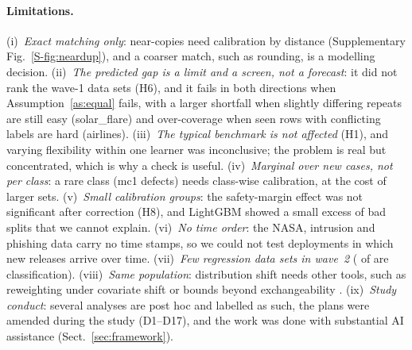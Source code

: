 \paragraph{Limitations.} (i)~\emph{Exact matching only}: near-copies need calibration by distance (Supplementary Fig.~\ref{S-fig:neardup}), and a coarser match, such as rounding, is a modelling decision. (ii)~\emph{The predicted gap is a limit and a screen, not a forecast}: it did not rank the wave-1 data sets (H6), and it fails in both directions when Assumption~\ref{as:equal} fails, with a larger shortfall when slightly differing repeats are still easy (solar\_flare) and over-coverage when seen rows with conflicting labels are hard (airlines). (iii)~\emph{The typical benchmark is not affected} (H1), and varying flexibility within one learner was inconclusive; the problem is real but concentrated, which is why a check is useful. (iv)~\emph{Marginal over new cases, not per class}: a rare class (mc1 defects) needs class-wise calibration, at the cost of larger sets. (v)~\emph{Small calibration groups}: the safety-margin effect was not significant after correction (H8), and LightGBM showed a small excess of bad splits that we cannot explain. (vi)~\emph{No time order}: the NASA, intrusion and phishing data carry no time stamps, so we could not test deployments in which new releases arrive over time. (vii)~\emph{Few regression data sets in wave~2} (\NWTwoNCls{} of \NWTwoN{} are classification). (viii)~\emph{Same population}: distribution shift needs other tools, such as reweighting under covariate shift \citep{tibshirani2019} or bounds beyond exchangeability \citep{barber2023}. (ix)~\emph{Study conduct}: several analyses are post hoc and labelled as such, the plans were amended during the study (D1--D17), and the work was done with substantial AI assistance (Sect.~\ref{sec:framework}).
